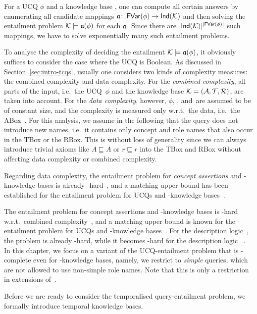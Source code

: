 \noindent
For a UCQ $\phi$ and a knowledge base \Kmc, one can compute all certain answers
by enumerating all candidate mappings $\mathfrak{a}\colon\operatorname{\mathsf{FVar}}(\phi)\to\mathsf{Ind}(\mathcal{K})$ and
then solving the entailment problem $\mathcal{K}\models\mathfrak{a}(\phi)$ for each $\mathfrak{a}$.
Since there are $\lvert\mathsf{Ind}(\mathcal{K})\rvert^{\lvert\operatorname{\mathsf{FVar}}(\phi)\rvert}$ such
mappings, we have to solve exponentially many such entailment problems.

To analyse the complexity of deciding the entailment $\mathcal{K}\models\mathfrak{a}(\phi)$, it
obviously suffices to consider the case where the UCQ is Boolean.  As discussed
in Section~\ref{sec:intro-tcqs}, usually one considers two kinds of complexity
measures: the combined complexity and data complexity.
%
For the \emph{combined complexity}, all parts of the input, i.e.~the UCQ~$\phi$
and the knowledge base $\mathcal{K}=(\mathcal{A},\mathcal{T},\mathcal{R})$, are taken into
account.  For the \emph{data complexity}, however, $\phi$, \Tmc, and~\Rmc are
assumed to be of constant size, and the complexity is measured only w.r.t.\ the
data, i.e.~the ABox~\Amc.
%
For this analysis, we assume in the following that the query does not introduce
new names, i.e.~it contains only concept and role names that also occur in the
TBox or the RBox.
%
This is without loss of generality since we can always introduce trivial axioms
like $A\sqsubseteq A$ or $r\sqsubseteq r$ into the TBox and RBox without
affecting data complexity or combined complexity.

Regarding data complexity, the entailment problem for \emph{concept assertions}
and \ALC-know\-ledge bases is already \coNP-hard~\cite{Sch-JIIS93,DLN+-JLC94},
and a matching upper bound has been established for the entailment problem for
UCQs and \SHQ-knowledge bases~\cite{GHL+-JAIR08}.

The entailment problem for concept assertions and \ALC-knowledge bases is
\ExpTime-hard w.r.t.\ combined complexity~\cite{DLhandbook-07}, and a matching
upper bound is known for the entailment problem for UCQs and \ALCHQ-knowledge
bases~\cite{Lut-IJCAR08}.  For the description logic~\Wmc, the problem is
already \coNExpTime-hard, while it becomes \TwoExpTime-hard for the description
logic \SH~\cite{ELO+-IJCAI09}.
%
In this chapter, we focus on a variant of the UCQ-entailment problem that is
\ExpTime-complete even for \SHQ-knowledge bases, namely, we restrict to
\emph{simple} queries, which are not allowed to use non-simple role names.  Note
that this is only a restriction in extensions of~\Wmc.

Before we are ready to consider the temporalised query-entailment problem, we
formally introduce temporal knowledge bases.


